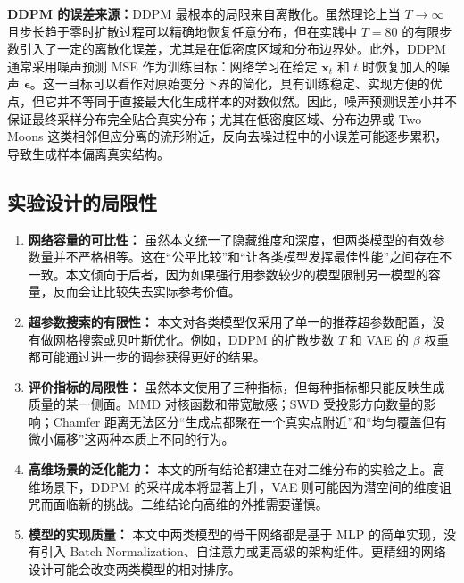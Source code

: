 \documentclass[UTF8,a4paper,12pt]{ctexart}
\begin{document}
\textbf{DDPM 的误差来源：}DDPM 最根本的局限来自离散化。虽然理论上当 $T\to\infty$ 且步长趋于零时扩散过程可以精确地恢复任意分布，但在实践中 $T=80$ 的有限步数引入了一定的离散化误差，尤其是在低密度区域和分布边界处。此外，DDPM 通常采用噪声预测 MSE 作为训练目标：网络学习在给定 $\mathbf{x}_t$ 和 $t$ 时恢复加入的噪声 $\boldsymbol{\epsilon}$。这一目标可以看作对原始变分下界的简化，具有训练稳定、实现方便的优点，但它并不等同于直接最大化生成样本的对数似然\cite{lai2025principles}。因此，噪声预测误差小并不保证最终采样分布完全贴合真实分布；尤其在低密度区域、分布边界或 Two Moons 这类相邻但应分离的流形附近，反向去噪过程中的小误差可能逐步累积，导致生成样本偏离真实结构。

\subsection{实验设计的局限性}

\begin{enumerate}
    \item \textbf{网络容量的可比性：} 虽然本文统一了隐藏维度和深度，但两类模型的有效参数量并不严格相等。这在“公平比较”和“让各类模型发挥最佳性能”之间存在不一致。本文倾向于后者，因为如果强行用参数较少的模型限制另一模型的容量，反而会让比较失去实际参考价值。

    \item \textbf{超参数搜索的有限性：} 本文对各类模型仅采用了单一的推荐超参数配置，没有做网格搜索或贝叶斯优化。例如，DDPM 的扩散步数 $T$ 和 VAE 的 $\beta$ 权重都可能通过进一步的调参获得更好的结果。

    \item \textbf{评价指标的局限性：} 虽然本文使用了三种指标，但每种指标都只能反映生成质量的某一侧面。MMD 对核函数和带宽敏感；SWD 受投影方向数量的影响；Chamfer 距离无法区分“生成点都聚在一个真实点附近”和“均匀覆盖但有微小偏移”这两种本质上不同的行为。

    \item \textbf{高维场景的泛化能力：} 本文的所有结论都建立在对二维分布的实验之上。高维场景下，DDPM 的采样成本将显著上升，VAE 则可能因为潜空间的维度诅咒而面临新的挑战。二维结论向高维的外推需要谨慎。

    \item \textbf{模型的实现质量：} 本文中两类模型的骨干网络都是基于 MLP 的简单实现，没有引入 Batch Normalization、自注意力或更高级的架构组件。更精细的网络设计可能会改变两类模型的相对排序。
\end{enumerate}

\end{document}
